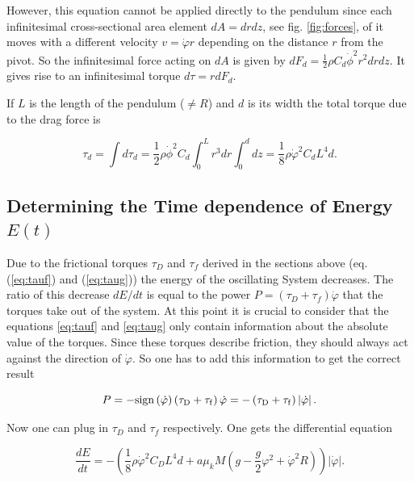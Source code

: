 However, this equation cannot be applied directly to the pendulum since each infinitesimal cross-sectional area element $dA=drdz$, see fig. \ref{fig:forces}, of it moves with a different velocity $v = \dot{\varphi}r$ depending on the distance $r$ from the pivot. So the infinitesimal force acting on $dA$ is given by $dF_d = \frac{1}{2} \rho  C_d  \dot{\phi}^2   r^2 dr dz$. It gives rise to an infinitesimal torque $d\tau = r dF_d$. 


If $L$ is the length of the pendulum ($\neq R$) and $d$ is its width the total torque due to the drag force is

\begin{equation}\label{eq:taug}
\tau_d = \int d\tau_d =  \frac{1}{2} \rho \dot{\phi}^2 C_d \int_0^L r^3 dr \int_0^d dz = \frac{1}{8}  \rho \dot{\varphi}^2  C_d L^4 d.
\end{equation}

\subsection{Determining the Time dependence of Energy $E(t)$}

Due to the frictional torques $\tau_D$ and $\tau_f$ derived in the sections above (eq. (\ref{eq:tauf}) and (\ref{eq:taug})) the energy of the oscillating System decreases. The ratio of this decrease $dE/dt$ is equal to the power $P=\left( \tau_D + \tau_f \right) \dot{\varphi}$ that the torques take out of the system. 
At this point it is crucial to consider that the equations \ref{eq:tauf} and \ref{eq:taug} only contain information about the absolute value of the torques. Since these torques describe friction, they should always act against the direction of $\dot{\varphi}$. So one has to add this information to get the correct result

\begin{equation}
P=-\rm{sign}\left(\dot{\varphi}\right) \left( \tau_D + \tau_f \right) \dot{\varphi} = -\left( \tau_D + \tau_f \right) \left|\dot{\varphi}\right|.
\end{equation} 

Now one can plug in $\tau_D$ and  $\tau_f$ respectively. One gets the differential equation

\begin{equation}
\frac{dE}{dt} = - \left( \frac{1}{8}  \rho \dot{\varphi}^2  C_D L^4 d + a \mu_k M \left(g - \frac{g}{2} \varphi^2  + \dot{\varphi}^2 R\right) \right)\left|\dot{\varphi}\right|.
\end{equation}

